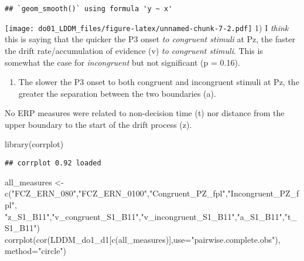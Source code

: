 \documentclass[
]{article}
\newenvironment{Shaded}{\begin{snugshade}}{\end{snugshade}}
\newcommand{\AttributeTok}[1]{\textcolor[rgb]{0.77,0.63,0.00}{#1}}
\newcommand{\FunctionTok}[1]{\textcolor[rgb]{0.00,0.00,0.00}{#1}}
\newcommand{\NormalTok}[1]{#1}
\newcommand{\OtherTok}[1]{\textcolor[rgb]{0.56,0.35,0.01}{#1}}
\newcommand{\StringTok}[1]{\textcolor[rgb]{0.31,0.60,0.02}{#1}}
\providecommand{\tightlist}{%
  \setlength{\itemsep}{0pt}\setlength{\parskip}{0pt}}
\begin{document}
\begin{verbatim}
## `geom_smooth()` using formula 'y ~ x'
\end{verbatim}

\texttt{[image: do01\_LDDM\_files/figure-latex/unnamed-chunk-7-2.pdf]} 1)
I \emph{think} this is saying that the quicker the P3 onset \emph{to
congruent stimuli} at Pz, the faster the drift rate/accumulation of
evidence (v) \emph{to congruent stimuli}. This is somewhat the case for
\emph{incongruent} but not significant (p = 0.16).

\begin{enumerate}
\def\labelenumi{\arabic{enumi})}
\setcounter{enumi}{1}
\tightlist
\item
  The slower the P3 onset to both congruent and incongruent stimuli at
  Pz, the greater the separation between the two boundaries (a).
\end{enumerate}

No ERP measures were related to non-decision time (t) nor distance from
the upper boundary to the start of the drift process (z).

\begin{Shaded}
\begin{Highlighting}[]
\FunctionTok{library}\NormalTok{(corrplot)}
\end{Highlighting}
\end{Shaded}

\begin{verbatim}
## corrplot 0.92 loaded
\end{verbatim}

\begin{Shaded}
\begin{Highlighting}[]
\NormalTok{all\_measures }\OtherTok{\textless{}{-}} \FunctionTok{c}\NormalTok{(}\StringTok{"FCZ\_ERN\_080"}\NormalTok{,}\StringTok{"FCZ\_ERN\_0100"}\NormalTok{,}\StringTok{"Congruent\_PZ\_fpl"}\NormalTok{,}\StringTok{"Incongruent\_PZ\_fpl"}\NormalTok{,}
                  \StringTok{"z\_S1\_B11"}\NormalTok{,}\StringTok{"v\_congruent\_S1\_B11"}\NormalTok{,}\StringTok{"v\_incongruent\_S1\_B11"}\NormalTok{,}\StringTok{"a\_S1\_B11"}\NormalTok{,}\StringTok{"t\_S1\_B11"}\NormalTok{)}
\FunctionTok{corrplot}\NormalTok{(}\FunctionTok{cor}\NormalTok{(LDDM\_do1\_d1[}\FunctionTok{c}\NormalTok{(all\_measures)],}\AttributeTok{use=}\StringTok{"pairwise.complete.obs"}\NormalTok{), }\AttributeTok{method=}\StringTok{"circle"}\NormalTok{)}
\end{Highlighting}
\end{Shaded}
\end{document}
